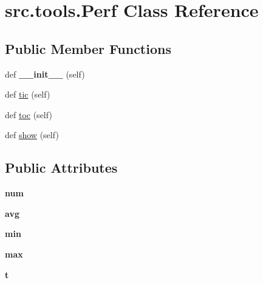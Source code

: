 \hypertarget{classsrc_1_1tools_1_1_perf}{}\section{src.\+tools.\+Perf Class Reference}
\label{classsrc_1_1tools_1_1_perf}
\subsection*{Public Member Functions}
\begin{DoxyCompactItemize}
\item 
\hypertarget{classsrc_1_1tools_1_1_perf_ac907a7d5957621b7013062ea05a5a7fc}{}\label{classsrc_1_1tools_1_1_perf_ac907a7d5957621b7013062ea05a5a7fc} 
def {\bfseries \+\_\+\+\_\+init\+\_\+\+\_\+} (self)
\item 
def \hyperlink{classsrc_1_1tools_1_1_perf_a0b7baa6b93ea6c10a7df605604aba102}{tic} (self)
\item 
def \hyperlink{classsrc_1_1tools_1_1_perf_a0c94a91dbe6e8096218c3ade8693e668}{toc} (self)
\item 
def \hyperlink{classsrc_1_1tools_1_1_perf_a288e73eef3613d368a5def35b5563640}{show} (self)
\end{DoxyCompactItemize}
\subsection*{Public Attributes}
\begin{DoxyCompactItemize}
\item 
\hypertarget{classsrc_1_1tools_1_1_perf_ade9370a0e4c29925d72e5c2020adf9e4}{}\label{classsrc_1_1tools_1_1_perf_ade9370a0e4c29925d72e5c2020adf9e4} 
{\bfseries num}
\item 
\hypertarget{classsrc_1_1tools_1_1_perf_a01ccb8327be74eb75aa28097d06a3802}{}\label{classsrc_1_1tools_1_1_perf_a01ccb8327be74eb75aa28097d06a3802} 
{\bfseries avg}
\item 
\hypertarget{classsrc_1_1tools_1_1_perf_a4f2e3f605c7eb4dbd4bc09958b5b40a0}{}\label{classsrc_1_1tools_1_1_perf_a4f2e3f605c7eb4dbd4bc09958b5b40a0} 
{\bfseries min}
\item 
\hypertarget{classsrc_1_1tools_1_1_perf_a2d5e372f7d80a31a4ed7e1fbd3b2d370}{}\label{classsrc_1_1tools_1_1_perf_a2d5e372f7d80a31a4ed7e1fbd3b2d370} 
{\bfseries max}
\item 
\hypertarget{classsrc_1_1tools_1_1_perf_af532b1474e60783bbd24d2a045f01546}{}\label{classsrc_1_1tools_1_1_perf_af532b1474e60783bbd24d2a045f01546} 
{\bfseries t}
\end{DoxyCompactItemize}


